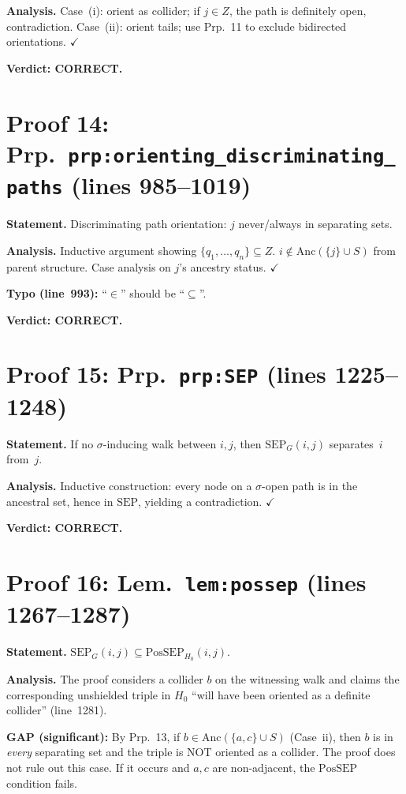 \documentclass{article}
\begin{document}
\textbf{Analysis.} Case~(i): orient as collider; if $j\in Z$, the path is
definitely open, contradiction.  Case~(ii): orient tails; use Prp.~11 to
exclude bidirected orientations.  $\checkmark$

\textbf{Verdict: CORRECT.}

\section{Proof 14: Prp.\ \texttt{prp:orienting\_discriminating\_paths}
(lines 985--1019)}
\textbf{Statement.} Discriminating path orientation: $j$ never/always in
separating sets.

\textbf{Analysis.} Inductive argument showing $\{q_1,\ldots,q_n\}\subseteq Z$.
$i\notin\mathrm{Anc}(\{j\}\cup S)$ from parent structure.
Case analysis on $j$'s ancestry status.  $\checkmark$

\textbf{Typo (line~993):} ``$\in$'' should be ``$\subseteq$''.

\textbf{Verdict: CORRECT.}

\section{Proof 15: Prp.\ \texttt{prp:SEP} (lines 1225--1248)}
\textbf{Statement.} If no $\sigma$-inducing walk between $i,j$, then
$\mathrm{SEP}_G(i,j)$ separates~$i$ from~$j$.

\textbf{Analysis.} Inductive construction: every node on a $\sigma$-open path
is in the ancestral set, hence in $\mathrm{SEP}$, yielding a contradiction.
$\checkmark$

\textbf{Verdict: CORRECT.}

\section{Proof 16: Lem.\ \texttt{lem:possep} (lines 1267--1287)}
\textbf{Statement.} $\mathrm{SEP}_G(i,j)\subseteq\mathrm{PosSEP}_{H_0}(i,j)$.

\textbf{Analysis.}
The proof considers a collider $b$ on the witnessing walk and claims the
corresponding unshielded triple in $H_0$ ``will have been oriented as a
definite collider'' (line~1281).

\textbf{GAP (significant):} By Prp.~13, if $b\in\mathrm{Anc}(\{a,c\}\cup S)$
(Case~ii), then $b$ is in \emph{every} separating set and the triple is NOT
oriented as a collider.  The proof does not rule out this case.  If it occurs
and $a,c$ are non-adjacent, the $\mathrm{PosSEP}$ condition fails.
\end{document}
